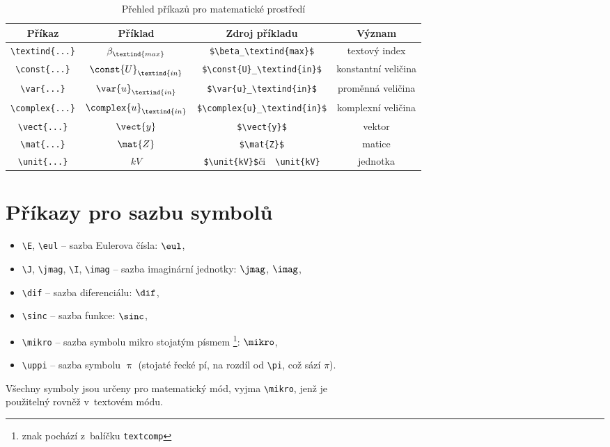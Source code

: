 \begin{table}[!h]
  \caption[Přehled příkazů]{Přehled příkazů pro matematické prostředí }
  \begin{center}
  	\small
	  \begin{tabular}{|c|c|c|c|}
	    \hline
	    Příkaz    						& Příklad 					& Zdroj příkladu  							& Význam  \\
	    \hline\hline
	    \verb|\textind{...}|	& $\beta_\textind{max}$ 	& \verb|$\beta_\textind{max}$|	& textový index \\
	    \hline
	    \verb|\const{...}| 		& $\const{U}_\textind{in}$ 				& \verb|$\const{U}_\textind{in}$|		& konstantní veličina \\
	    \hline
	    \verb|\var{...}| 		& $\var{u}_\textind{in}$ & \verb|$\var{u}_\textind{in}$| & proměnná veličina \\
	    \hline
	    \verb|\complex{...}| 	& $\complex{u}_\textind{in}$ & \verb|$\complex{u}_\textind{in}$| & komplexní veličina \\
	    \hline
	    \verb|\vect{...}| 		& $\vect{y}$ 						& \verb|$\vect{y}$| & vektor \\
	    \hline
	    \verb|\mat{...}| 	& $\mat{Z}$ 						& \verb|$\mat{Z}$| & matice \\
	    \hline
	    \verb|\unit{...}| 		& $\unit{kV}$ 						& \verb|$\unit{kV}$|\quad či\ \, \verb|\unit{kV}| & jednotka \\
	    \hline
	  \end{tabular}
  \end{center}
\end{table}



\section{Příkazy pro sazbu symbolů}

\begin{itemize}
  \item
    \verb|\E|, \verb|\eul| -- sazba Eulerova čísla: $\eul$,
  \item
    \verb|\J|, \verb|\jmag|, \verb|\I|, \verb|\imag| -- sazba imaginární jednotky: $\jmag$, $\imag$,
  \item
    \verb|\dif| -- sazba diferenciálu: $\dif$,
  \item
    \verb|\sinc| -- sazba funkce: $\sinc$,
  \item
    \verb|\mikro| -- sazba symbolu mikro stojatým písmem%
			\footnote{znak pochází z~balíčku \texttt{textcomp}}: $\mikro$,
	\item
		\verb|\uppi| -- sazba symbolu $\uppi$
			(stojaté řecké pí, na rozdíl od \verb|\pi|, což sází $\pi$).
\end{itemize}
%
Všechny symboly jsou určeny pro matematický mód, vyjma \verb|\mikro|, jenž je\\ použitelný rovněž v~textovém módu.

